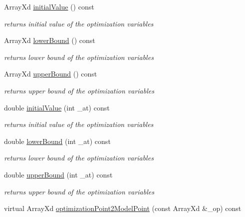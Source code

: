 \begin{DoxyCompactItemize}
Array\-Xd \hyperlink{class_go_s_u_m_1_1_c_optimization_problem_a059b8195bc967b4a2edb5ab5b4522b60}{initial\-Value} () const 
\begin{DoxyCompactList}\small\item\em returns initial value of the optimization variables \end{DoxyCompactList}\item 
Array\-Xd \hyperlink{class_go_s_u_m_1_1_c_optimization_problem_aa495f98c4202dd664c3770d48f2dbcfd}{lower\-Bound} () const 
\begin{DoxyCompactList}\small\item\em returns lower bound of the optimization variables \end{DoxyCompactList}\item 
Array\-Xd \hyperlink{class_go_s_u_m_1_1_c_optimization_problem_a67ea0cec933c9a185dc178e9cb96a864}{upper\-Bound} () const 
\begin{DoxyCompactList}\small\item\em returns upper bound of the optimization variables \end{DoxyCompactList}\item 
double \hyperlink{class_go_s_u_m_1_1_c_optimization_problem_aee572432ac34abbf2f11b9f0cde1f350}{initial\-Value} (int \-\_\-at) const 
\begin{DoxyCompactList}\small\item\em returns initial value of the optimization variables \end{DoxyCompactList}\item 
double \hyperlink{class_go_s_u_m_1_1_c_optimization_problem_afe3a230fd61bb48197b3ce878fa5d16c}{lower\-Bound} (int \-\_\-at) const 
\begin{DoxyCompactList}\small\item\em returns lower bound of the optimization variables \end{DoxyCompactList}\item 
double \hyperlink{class_go_s_u_m_1_1_c_optimization_problem_ac99964b20afcd3c30ba4b851ed7aec55}{upper\-Bound} (int \-\_\-at) const 
\begin{DoxyCompactList}\small\item\em returns upper bound of the optimization variables \end{DoxyCompactList}\item 
virtual Array\-Xd \hyperlink{class_go_s_u_m_1_1_c_optimization_problem_a34af38795520696f8abb418ecfd521f2}{optimization\-Point2\-Model\-Point} (const Array\-Xd \&\-\_\-op) const 

\end{DoxyCompactItemize}
